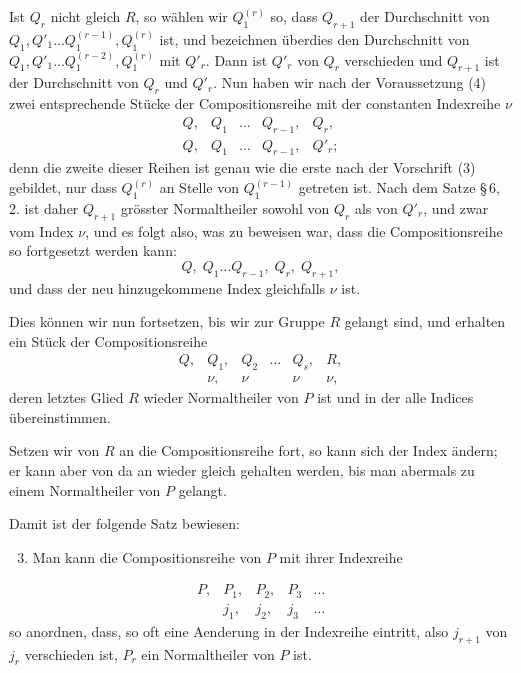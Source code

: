 \documentclass[11pt]{article}
\begin{document}
Ist $Q_r$ nicht gleich $R$, so wählen wir $Q_1^{(r)}$ so, dass $Q_{r+1}$ der Durchschnitt von $Q_1,Q'_1\ldots Q_1^{(r-1)},Q_1^{(r)}$ ist, und bezeichnen überdies den Durchschnitt von $Q_1,Q'_1\ldots Q_1^{(r-2)},Q_1^{(r)}$ mit $Q'_r$. Dann ist $Q'_r$ von $Q_r$ verschieden und $Q_{r+1}$ ist der Durchschnitt von $Q_r$ und $Q'_r$. Nun haben wir nach der Voraussetzung (4) zwei entsprechende Stücke der Compositionsreihe mit der constanten Indexreihe $\nu$
\begin{equation}
\begin{array}{ccccc}
Q,&Q_1&\ldots&Q_{r-1},&Q_r,\\
Q,&Q_1&\ldots&Q_{r-1},&Q'_r;
\end{array}
\tag{5}
\end{equation}
denn die zweite dieser Reihen ist genau wie die erste nach der Vorschrift (3) gebildet, nur dass $Q_1^{(r)}$ an Stelle von $Q_1^{(r-1)}$ getreten ist. Nach dem Satze \S\,6, 2. ist daher $Q_{r+1}$ grösster Normaltheiler sowohl von $Q_r$ als von $Q'_r$, und zwar vom Index $\nu$, und es folgt also, was zu beweisen war, dass die Compositionsreihe so fortgesetzt werden kann:
\begin{equation}
Q,\;Q_1\ldots Q_{r-1},\;Q_r,\;Q_{r+1},
\tag{6}
\end{equation}
und dass der neu hinzugekommene Index gleichfalls $\nu$ ist.

Dies können wir nun fortsetzen, bis wir zur Gruppe $R$ gelangt sind, und erhalten ein Stück der Compositionsreihe
\begin{equation}
\begin{array}{cccccc}
Q,&Q_1,&Q_2&\ldots&Q_s,&R,\\
&\nu,&\nu&&\nu&\nu,
\end{array}
\tag{7}
\end{equation}
deren letztes Glied $R$ wieder Normaltheiler von $P$ ist und in der alle Indices übereinstimmen.

Setzen wir von $R$ an die Compositionsreihe fort, so kann sich der Index ändern; er kann aber von da an wieder gleich gehalten werden, bis man abermals zu einem Normaltheiler von $P$ gelangt.

Damit ist der folgende Satz bewiesen:
\begin{enumerate}[label=\Roman*.]
\setcounter{enumi}{2}
\item Man kann die Compositionsreihe von $P$ mit ihrer Indexreihe
\end{enumerate}
\begin{equation}
\begin{array}{cccccc}
P,&P_1,&P_2,&P_3&\ldots\\
&j_1,&j_2,&j_3&\ldots
\end{array}
\tag{8}
\end{equation}
so anordnen, dass, so oft eine Aenderung in der Indexreihe eintritt, also $j_{r+1}$ von $j_r$ verschieden ist, $P_r$ ein Normaltheiler von $P$ ist.
\end{document}
